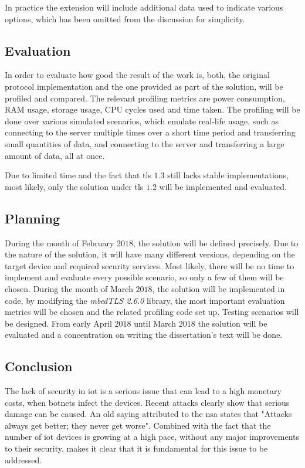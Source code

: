 \documentclass{llncs}
\begin{document}
{In practice the extension will include additional data used to indicate various options, which has been omitted from the discussion for simplicity.

\subsection{Evaluation}

In order to evaluate how good the result of the work is, both, the original protocol
implementation and the one provided as part of the solution, will be profiled and compared. The relevant profiling metrics are power consumption, RAM usage, storage usage,
CPU cycles used and time taken. The profiling
will be done over various simulated scenarios, which emulate real-life usage,
such as connecting to the server multiple times over a short time period and transferring
small quantities of data, and connecting to the server and transferring a large
amount of data, all at once.

Due to limited time and the fact that \gls{tls} $1.3$ still lacks stable implementations, most likely, only the solution under \gls{tls} $1.2$ will be implemented and evaluated.

\subsection{Planning}

During the month of February $2018$, the solution will be defined precisely.
Due to the nature of the solution, it will have many different versions, depending
on the target device and required security services. Most likely, there will be no time
to implement and evaluate every possible scenario, so only a few of them will be chosen.
During the month of March $2018$, the solution will be implemented in code, by modifying
the \textit{mbedTLS 2.6.0} library\cite{SSLLibra13:online}, the most important evaluation metrics will be chosen and the related profiling code set up. Testing scenarios will be designed.
From early April $2018$ until March $2018$ the solution will be evaluated and a concentration on writing the dissertation's text will be done.

\subsection{Conclusion}

The lack of security in \gls{iot} is a serious issue that can lead to a high monetary costs,
when botnets infect the devices. Recent
attacks clearly show that serious damage can be caused. An old saying attributed to the
\gls{nsa} states that "Attacks always get better; they never get worse".
Combined with the fact that the number of \gls{iot} devices is growing at a high
pace, without any major improvements to their security, makes it clear
that it is fundamental for this issue to be addressed.

}
\end{document}
